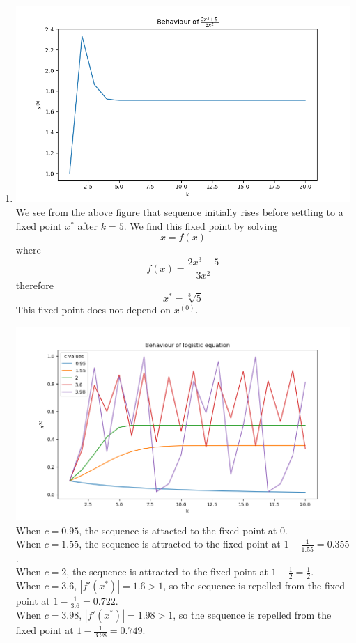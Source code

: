 \documentclass[letterpaper,12pt]{article} %
\begin{document}
\begin{enumerate}
  \item {
    \includegraphics[width=\textwidth]{q2seq1}
    We see from the above figure that sequence initially rises before settling to a fixed point \(x^*\) after \(k=5\). We find this fixed point by solving
    \[ x = f(x) \]
    where
    \[ f(x) = \frac{2x^3 + 5}{3x^2} \]
    therefore
    \[ x^* = \sqrt[3]{5} \]
    This fixed point does not depend on \(x^{(0)}\).
    
    \includegraphics[width=\textwidth]{q2logseq}
    When \(c=0.95\), the sequence is attacted to the fixed point at 0.\\
    When \(c=1.55\), the sequence is attracted to the fixed point at \( 1-\frac{1}{1.55} = 0.355 \).\\
    When \(c=2\), the sequence is attracted to the fixed point at \( 1-\frac{1}{2} = \frac{1}{2} \).\\
    When \(c=3.6\), \(|f'(x^*)| = 1.6 > 1 \), so the sequence is repelled from the fixed point at \( 1-\frac{1}{3.6} = 0.722 \).\\
    When \(c=3.98\), \(|f'(x^*)| = 1.98 > 1 \), so the sequence is repelled from the fixed point at \( 1-\frac{1}{3.98} = 0.749 \).
  }
  

\end{enumerate}
\end{document}
